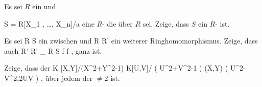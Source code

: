 {}
{





Es sei $R$ ein
und

\mavergleichskettedisp
{\vergleichskette
{S
}
{ =} { R[X_1 , \ldots , X_n]/{\mathfrak a}
}
{ } {
}
{ } {
}
{ } {
}
}
{}{}{}
eine
 {} {}
$R$-
die
über $R$ sei. Zeige, dass $S$ ein
$R$-
ist.





}
{} {}

{}
{





Es sei
\maabbdisp {\varphi} { R } { S
} {}
ein
zwischen
und
\maabb {} { R } { R'
} {}
ein weiterer Ringhomomorphismus. Zeige, dass auch
 {R'} { R' \otimes_{ R } S
} { f } { f 
} {,}
ganz ist.





}
{} {}

{}
{





Zeige, dass der
\maabbeledisp {} { K [X,Y]/(X^2+Y^2-1) } { K[U,V]/ \left(  U^2+V^2-1  \right)
} {(X,Y)} { \left(  U^2-V^2,2UV  \right)
} {,}
über jedem
der
$\neq 2$
ist.





}
{} {}


